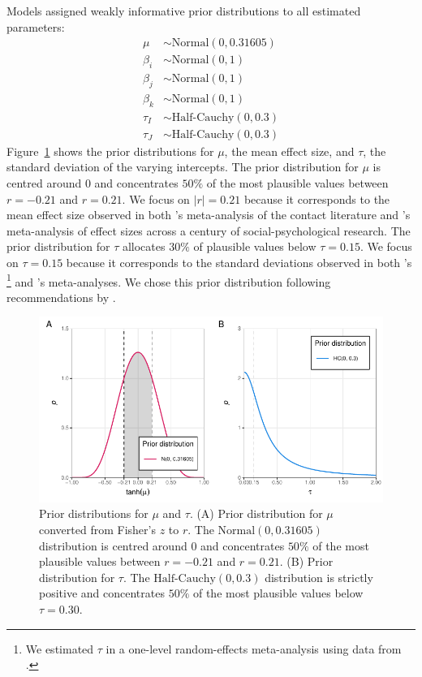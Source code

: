 \documentclass[10pt, a4paper]{article}
\begin{document}
Models assigned weakly informative prior distributions \cite{gelman_prior_2017} to all estimated parameters:
\begin{align*} 
\mu &\sim \text{Normal}(0, 0.31605) \\
\beta_i &\sim \text{Normal}(0, 1) \\
\beta_j &\sim \text{Normal}(0, 1) \\
\beta_k &\sim \text{Normal}(0, 1) \\
\tau_I &\sim \text{Half-Cauchy}(0, 0.3) \\
\tau_J &\sim \text{Half-Cauchy}(0, 0.3)
\end{align*}
Figure~\ref{fig:f2} shows the prior distributions for $\mu$, the mean effect size, and $\tau$, the standard deviation of the varying intercepts. The prior distribution for $\mu$ is centred around $0$ and concentrates $50\%$ of the most plausible values between $r = -0.21$ and $r = 0.21$. We focus on $|r| = 0.21$ because it corresponds to the mean effect size observed in both \citeauthor{pettigrew_meta_2006}'s \citeyear{pettigrew_meta_2006} meta-analysis of the contact literature and \citeauthor{richard_meta_2003}'s \citeyear{richard_meta_2003} meta-analysis of effect sizes across a century of social-psychological research. The prior distribution for $\tau$ allocates $30\%$ of plausible values below $\tau = 0.15$. We focus on $\tau = 0.15$ because it corresponds to the standard deviations observed in both \citeauthor{pettigrew_meta_2006}'s \citeyear{pettigrew_meta_2006}\footnote{We estimated $\tau$ in a one-level random-effects meta-analysis using data from .} and \citeauthor{richard_meta_2003}'s \citeyear{richard_meta_2003} meta-analyses. We chose this prior distribution following recommendations by .
 
\begin{figure}
\centering
\includegraphics[width = \textwidth]{prior-choice}
\caption{Prior distributions for $\mu$ and $\tau$. (A) Prior distribution for $\mu$ converted from Fisher's $z$ to $r$. The $\text{Normal}(0, 0.31605)$ distribution is centred around $0$ and concentrates $50\%$ of the most plausible values between $r = -0.21$ and $r = 0.21$. (B) Prior distribution for $\tau$. The $\text{Half-Cauchy}(0, 0.3)$ distribution is strictly positive and concentrates $50\%$ of the most plausible values below $\tau = 0.30$.}
\label{fig:f2}
\end{figure}
\end{document}
